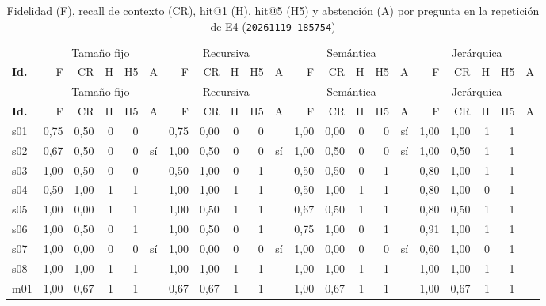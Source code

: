 \begin{scriptsize}
\setlength{\tabcolsep}{1.8pt}\renewcommand{\arraystretch}{0.92}
\begin{longtable}{@{}l rrrrc rrrrc rrrrc rrrrc@{}}
\caption[Ejecución repetida de E4, por pregunta]{Fidelidad (F), recall de contexto (CR), hit@1 (H), hit@5 (H5) y abstención (A) por pregunta en la repetición de E4 (\texttt{20261119-185754})}\label{tab:ap-e4-rep} \\
\toprule
& \multicolumn{5}{c}{Tamaño fijo} & \multicolumn{5}{c}{Recursiva} & \multicolumn{5}{c}{Semántica} & \multicolumn{5}{c}{Jerárquica} \\
\cmidrule(lr){2-6}\cmidrule(lr){7-11}\cmidrule(lr){12-16}\cmidrule(lr){17-21}
\textbf{Id.} & F & CR & H & H5 & A & F & CR & H & H5 & A & F & CR & H & H5 & A & F & CR & H & H5 & A \\
\midrule
\endfirsthead
\toprule
& \multicolumn{5}{c}{Tamaño fijo} & \multicolumn{5}{c}{Recursiva} & \multicolumn{5}{c}{Semántica} & \multicolumn{5}{c}{Jerárquica} \\
\cmidrule(lr){2-6}\cmidrule(lr){7-11}\cmidrule(lr){12-16}\cmidrule(lr){17-21}
\textbf{Id.} & F & CR & H & H5 & A & F & CR & H & H5 & A & F & CR & H & H5 & A & F & CR & H & H5 & A \\
\midrule
\endhead
s01 & 0,75 & 0,50 & 0 & 0 &  & 0,75 & 0,00 & 0 & 0 &  & 1,00 & 0,00 & 0 & 0 & sí & 1,00 & 1,00 & 1 & 1 &  \\
s02 & 0,67 & 0,50 & 0 & 0 & sí & 1,00 & 0,50 & 0 & 0 & sí & 1,00 & 0,50 & 0 & 0 & sí & 1,00 & 0,50 & 1 & 1 &  \\
s03 & 1,00 & 0,50 & 0 & 0 &  & 0,50 & 1,00 & 0 & 1 &  & 0,50 & 0,50 & 0 & 1 &  & 0,80 & 1,00 & 1 & 1 &  \\
s04 & 0,50 & 1,00 & 1 & 1 &  & 1,00 & 1,00 & 1 & 1 &  & 0,50 & 1,00 & 1 & 1 &  & 0,80 & 1,00 & 0 & 1 &  \\
s05 & 1,00 & 0,00 & 1 & 1 &  & 1,00 & 0,50 & 1 & 1 &  & 0,67 & 0,50 & 1 & 1 &  & 0,80 & 0,50 & 1 & 1 &  \\
s06 & 1,00 & 0,50 & 0 & 1 &  & 1,00 & 0,50 & 0 & 1 &  & 0,75 & 1,00 & 0 & 1 &  & 0,91 & 1,00 & 1 & 1 &  \\
s07 & 1,00 & 0,00 & 0 & 0 & sí & 1,00 & 0,00 & 0 & 0 & sí & 1,00 & 0,00 & 0 & 0 & sí & 0,60 & 1,00 & 0 & 1 &  \\
s08 & 1,00 & 1,00 & 1 & 1 &  & 1,00 & 1,00 & 1 & 1 &  & 1,00 & 1,00 & 1 & 1 &  & 1,00 & 1,00 & 1 & 1 &  \\
m01 & 1,00 & 0,67 & 1 & 1 &  & 0,67 & 0,67 & 1 & 1 &  & 1,00 & 0,67 & 1 & 1 &  & 1,00 & 0,67 & 1 & 1 &  \\

\end{longtable}
\end{scriptsize}
